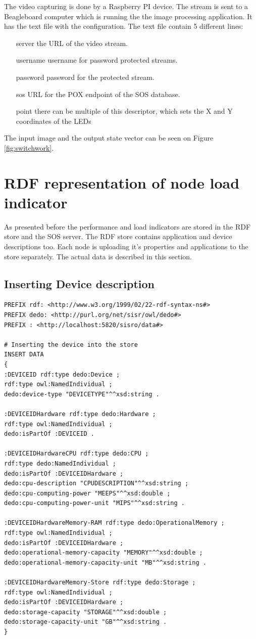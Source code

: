 The video capturing is done by a Raspberry PI device. The stream is sent to a Beagleboard computer which is running the the image processing application. It has the text file with the configuration. The text file contain 5 different lines:
\begin{itemize}
	\item[server] the URL of the video stream.
	\item[username] username for password protected streams.
	\item[password] password for the protected stream.
	\item[sos] URL for the POX endpoint of the SOS database.
	\item[point] there can be multiple of this descriptor, which sets the X and Y coordinates of the LEDs
\end{itemize}	
The input image and the output state vector can be seen on Figure \ref{fig:switchwork}.

\section{RDF representation of node load indicator}

As presented before the performance and load indicators are stored in the RDF store and the SOS server. The RDF store contains application and device descriptions too. Each node is uploading it's properties and applications to the store separately. The actual data is described in this section.

\subsection{Inserting Device description}


\begin{lstlisting}[caption={Template for Device information\label{lst:tempdev}}]
PREFIX rdf: <http://www.w3.org/1999/02/22-rdf-syntax-ns#>
PREFIX dedo: <http://purl.org/net/sisr/owl/dedo#>
PREFIX : <http://localhost:5820/sisro/data#>

# Inserting the device into the store
INSERT DATA
{ 
:DEVICEID rdf:type dedo:Device ;
rdf:type owl:NamedIndividual ;
dedo:device-type "DEVICETYPE"^^xsd:string .

:DEVICEIDHardware rdf:type dedo:Hardware ;
rdf:type owl:NamedIndividual ;
dedo:isPartOf :DEVICEID .

:DEVICEIDHardwareCPU rdf:type dedo:CPU ;
rdf:type dedo:NamedIndividual ;
dedo:isPartOf :DEVICEIDHardware ;
dedo:cpu-description "CPUDESCRIPTION"^^xsd:string ;
dedo:cpu-computing-power "MEEPS"^^xsd:double ;
dedo:cpu-computing-power-unit "MIPS"^^xsd:string .

:DEVICEIDHardwareMemory-RAM rdf:type dedo:OperationalMemory ;
rdf:type owl:NamedIndividual ;
dedo:isPartOf :DEVICEIDHardware ;
dedo:operational-memory-capacity "MEMORY"^^xsd:double ;
dedo:operational-memory-capacity-unit "MB"^^xsd:string .

:DEVICEIDHardwareMemory-Store rdf:type dedo:Storage ;
rdf:type owl:NamedIndividual ;
dedo:isPartOf :DEVICEIDHardware ;
dedo:storage-capacity "STORAGE"^^xsd:double ;
dedo:storage-capacity-unit "GB"^^xsd:string .
} 
\end{lstlisting}


